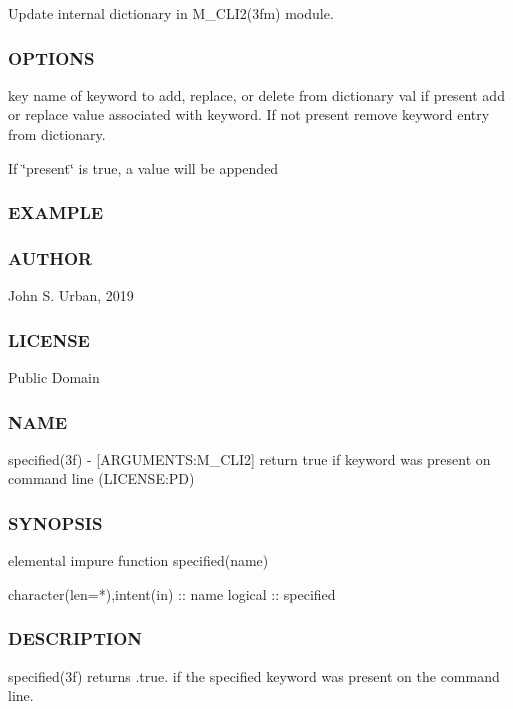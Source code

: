 Update internal dictionary in M\+\_\+\+C\+L\+I2(3fm) module. \subsubsection*{O\+P\+T\+I\+O\+NS}

key name of keyword to add, replace, or delete from dictionary val if present add or replace value associated with keyword. If not present remove keyword entry from dictionary.

If \char`\"{}present\char`\"{} is true, a value will be appended \subsubsection*{E\+X\+A\+M\+P\+LE}

\subsubsection*{A\+U\+T\+H\+OR}

John S. Urban, 2019 \subsubsection*{L\+I\+C\+E\+N\+SE}

Public Domain \subsubsection*{N\+A\+ME}

specified(3f) -\/ \mbox{[}A\+R\+G\+U\+M\+E\+N\+TS\+:M\+\_\+\+C\+L\+I2\mbox{]} return true if keyword was present on command line (L\+I\+C\+E\+N\+SE\+:PD)

\subsubsection*{S\+Y\+N\+O\+P\+S\+IS}

\begin{DoxyVerb}elemental impure function specified(name)

 character(len=*),intent(in) :: name
 logical :: specified
\end{DoxyVerb}


\subsubsection*{D\+E\+S\+C\+R\+I\+P\+T\+I\+ON}

\begin{DoxyVerb}specified(3f) returns .true. if the specified keyword was present on
the command line.
\end{DoxyVerb}


